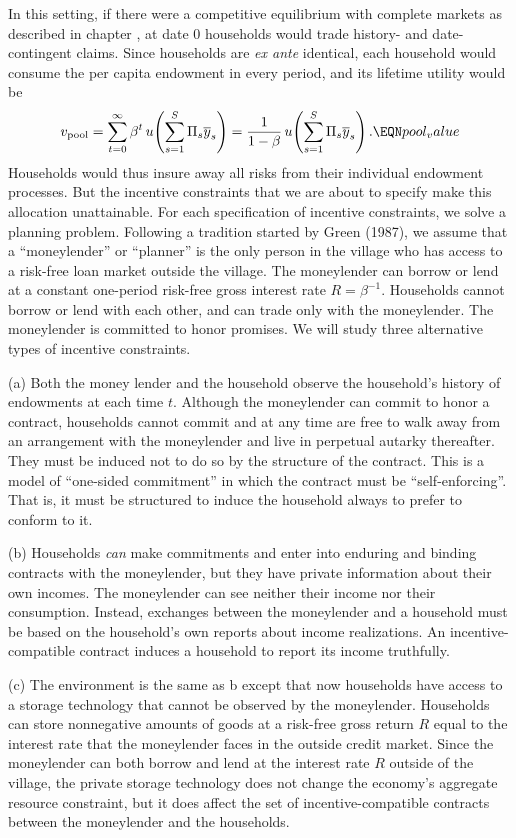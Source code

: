 In  this setting, if there were a competitive equilibrium with
complete markets as described in chapter , at date
$0$ households would trade history- and date-contingent claims. Since  households are {\it ex ante\/}
identical, each household would consume the per capita
endowment in every period, and its lifetime utility would be
$$ v_{\rm pool} = \sum_{t=0}^\infty
\beta^t \, u\!\left(\sum_{s=1}^S \Pi_s \overline y_s\right) =
 {1 \over 1-\beta}\, u\!\left(\sum_{s=1}^S \Pi_s \overline y_s\right) .
                                                        \EQN pool_value $$
 Households would thus insure away all
risks from their individual endowment processes. But the
 incentive constraints that we are about to specify make
this allocation unattainable. For each specification of incentive
constraints, we  solve a planning problem.
%
   Following a tradition started by
Green (1987),
we assume that a ``moneylender'' or ``planner'' is
the only person in the  village who has access to
a risk-free loan market outside the village.
The moneylender can borrow or lend at a constant one-period
risk-free gross interest rate  $R=\beta^{-1}$.
Households cannot borrow or lend with each other,
and can  trade only with the moneylender.  The moneylender is committed   to honor  
promises.
We will study three alternative types  of incentive constraints.
\medskip
\item{  (a) } Both the money lender and the household observe   the household's  history of endowments at each  time $t$.
Although the moneylender can commit to honor a
contract, households  cannot commit and at any time are
  free to walk away from an arrangement
with the moneylender
and live in perpetual autarky thereafter.  They must be induced not to do so
by the structure of
the contract.
This is a model of ``one-sided commitment'' in which the
contract must be ``self-enforcing''.  That is, it must be structured to induce   the household always to  prefer to
conform to it.
\item{ (b) } Households {\it can\/} make commitments  and enter
into enduring and   binding contracts with the moneylender,
but they have private
information about their own incomes. The moneylender
can see neither their income nor their consumption. Instead,
 exchanges between the moneylender and a household must
be based on the household's own reports about income
realizations. An incentive-compatible contract  induces
a household to report its income truthfully.

\item{(c) } The environment is the same as  b except  that now households have access to a storage technology that
cannot be observed by the moneylender.
Households can store nonnegative amounts of goods at a risk-free
gross return  $R$ equal to the interest rate that
the moneylender faces in the outside credit market.
Since the moneylender can both borrow and lend at the interest
rate $R$ outside of the village,
the private storage technology does not change the economy's
aggregate resource constraint, but it does  affect the set of
incentive-compatible contracts between the moneylender and the
households.


